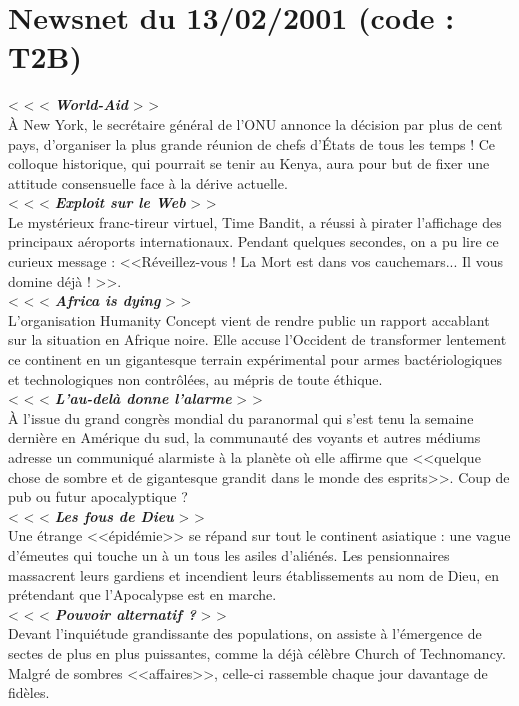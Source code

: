 \documentclass[11pt,twoside,a4paper]{book}
\begin{document}
\section*{Newsnet du 13/02/2001 (code : T2B)}

< < <  \textbf{\textit{World-Aid}} > >~\\
{\`A} New York, le secr{\'e}taire g{\'e}n{\'e}ral de l'ONU annonce la d{\'e}cision par plus de cent pays, d'organiser la plus grande r{\'e}union de chefs d'{\'E}tats de tous les temps ! Ce colloque historique, qui pourrait se tenir au Kenya, aura pour but de fixer une attitude consensuelle face {\`a} la d{\'e}rive actuelle.~\\
< < <  \textbf{\textit{Exploit sur le Web}} > >~\\
Le myst{\'e}rieux franc-tireur virtuel, Time Bandit, a r{\'e}ussi {\`a} pirater l'affichage des principaux a{\'e}roports internationaux. Pendant quelques secondes, on a pu lire ce curieux message : <<R{\'e}veillez-vous ! La Mort est dans vos cauchemars... Il vous domine d{\'e}j{\`a} ! >>.~\\
< < <  \textbf{\textit{Africa is dying}} > >~\\
L'organisation Humanity Concept vient de rendre public un rapport accablant sur la situation en Afrique noire. Elle accuse l'Occident de transformer lentement ce continent en un gigantesque terrain exp{\'e}rimental pour armes bact{\'e}riologiques et technologiques non contr{\^o}l{\'e}es, au m{\'e}pris de toute {\'e}thique.~\\
< < <  \textbf{\textit{L'au-del{\`a} donne l'alarme}} > >~\\
{\`A} l'issue du grand congr{\`e}s mondial du paranormal qui s'est tenu la semaine derni{\`e}re en Am{\'e}rique du sud, la communaut{\'e} des voyants et autres m{\'e}diums adresse un communiqu{\'e} alarmiste {\`a} la plan{\`e}te o{\`u} elle affirme que <<quelque chose de sombre et de gigantesque grandit dans le monde des esprits>>. Coup de pub ou futur apocalyptique ?~\\
< < <  \textbf{\textit{Les fous de Dieu}} > >~\\
Une {\'e}trange <<{\'e}pid{\'e}mie>> se r{\'e}pand sur tout le continent asiatique : une vague d'{\'e}meutes qui touche un {\`a} un tous les asiles d'ali{\'e}n{\'e}s. Les pensionnaires massacrent leurs gardiens et incendient leurs {\'e}tablissements au nom de Dieu, en pr{\'e}tendant que l'Apocalypse est en marche.~\\
< < <  \textbf{\textit{Pouvoir alternatif ?}} > >~\\
Devant l'inqui{\'e}tude grandissante des populations, on assiste {\`a} l'{\'e}mergence de sectes de plus en plus puissantes, comme la d{\'e}j{\`a} c{\'e}l{\`e}bre Church of Technomancy. Malgr{\'e} de sombres <<affaires>>, celle-ci rassemble chaque jour davantage de fid{\`e}les.~\\
\end{document}
